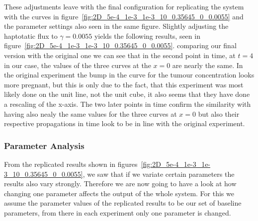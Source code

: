 These adjustments leave with the final configuration for replicating the system with the curves in figure~\ref{fig:2D_5e-4_1e-3_1e-3_10_0.35645_0_0.0055} and the parameter settings also seen in the same figure.
Slightly adjusting the haptotatic flux to $\gamma=0.0055$ yields the following results, seen in figure~\ref{fig:2D_5e-4_1e-3_1e-3_10_0.35645_0_0.0055}. comparing our final version with the original one we can see that in the second point in time, at $t=4$ in our case, the values of the three curves at the $x=0$ are nearly the same. In the original experiment the bump in the curve for the tumour concentration looks more pregnant, but this is only due to the fact, that this experiment was most likely done on the unit line, not the unit cube, it also seems that they have done a rescaling of the x-axis. The two later points in time confirm the similarity with having also nealy the same values for the three curves at $x=0$ but also their respective propagations in time look to be in line with the original experiment. 



\subsubsection{Parameter Analysis}
From the replicated results shown in figures~\ref{fig:2D_5e-4_1e-3_1e-3_10_0.35645_0_0.0055}, we saw that if we variate certain parameters the results also vary strongly. Therefore we are now going to have a look at how changing one parameter affects the output of the whole system. For this we assume the parameter values of the replicated results to be our set of baseline parameters, from there in each experiment only one parameter is changed. 
